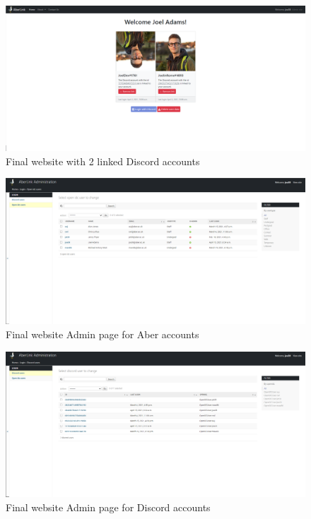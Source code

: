 \begin{figure}[H]
	\centering
	\includegraphics[width=1\linewidth]{Figures/website-acc-2.png}
	\caption{Final website with 2 linked Discord accounts}
	\label{fig:final-web-acc-2}
\end{figure}

\begin{figure}[H]
	\centering
	\includegraphics[width=1\linewidth]{Figures/website-admin-openidc.png}
	\caption{Final website Admin page for Aber accounts}
	\label{fig:final-web-admin-openidc}
\end{figure}

\begin{figure}[H]
	\centering
	\includegraphics[width=1\linewidth]{Figures/website-admin-discord.png}
	\caption{Final website Admin page for Discord accounts}
	\label{fig:final-web-admin-dis}
\end{figure}

